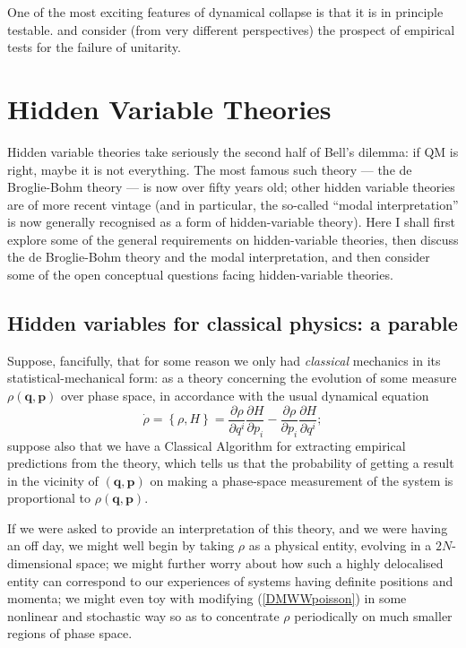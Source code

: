 \documentclass[12pt]{article}
\newcommand{\be}{\begin{equation}}
\newcommand{\ee}{\end{equation}}
\newcommand{\pb}[2]{\ensuremath{\left\{ #1 , #2 \right\} }}
\newcommand{\vctr}[1]{\ensuremath{\mathbf{ #1 }}}
\newcommand{\pbp}[2]{\ensuremath{\frac{\partial #1}{\partial #2}}}
\begin{document}
One of the most exciting features of dynamical collapse is that it is in principle testable.  and  consider (from very different perspectives) the prospect of empirical tests for the failure of unitarity.

\section{Hidden Variable Theories}\label{DMWWhidden}

Hidden variable theories take seriously the second half of Bell's dilemma: if QM is right, maybe it is not everything. The most famous such theory ---  the de Broglie-Bohm theory --- is now over fifty years old; other hidden variable theories are of more recent vintage (and in particular, the so-called ``modal interpretation'' is now generally recognised as a form of hidden-variable theory). Here I shall first explore some of the general requirements on hidden-variable theories, then discuss the de Broglie-Bohm theory and the modal interpretation, and then consider some of the open conceptual questions facing hidden-variable theories.

\subsection{Hidden variables for classical physics: a parable}\label{DMWWhvintro}

Suppose, fancifully, that for some reason we only had \emph{classical} mechanics in its statistical-mechanical form: as a theory concerning the evolution of some measure $\rho(\vctr{q},\vctr{p})$ over phase space, in accordance with the usual dynamical equation
\be\label{DMWWpoisson}
\dot{\rho}=\pb{\rho}{H}=\pbp{\rho}{q^i}\pbp{H}{p_i}-\pbp{\rho}{p_i}\pbp{H}{q^i};
\ee
suppose also that we have a Classical Algorithm for extracting empirical predictions from the theory, which tells us that the probability of getting a result in the vicinity of $(\vctr{q},\vctr{p})$ on making a phase-space measurement of the system is proportional to $\rho(\vctr{q},\vctr{p})$. 

If we were asked to provide an interpretation of this theory, and we were having an off day, we might well begin by taking $\rho$ as a physical entity, evolving in a $2N$-dimensional space; we might further worry about how such a highly delocalised entity can correspond to our experiences of systems having definite positions and momenta; we might even toy with modifying (\ref{DMWWpoisson}) in some nonlinear and stochastic way so as to concentrate $\rho$ periodically on much smaller regions of phase space.
\end{document}
